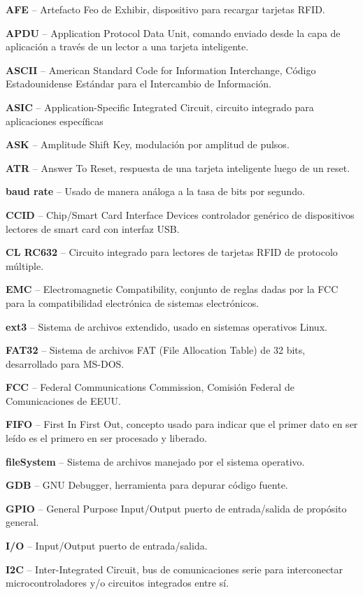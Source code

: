 \begin{glosario}

{\bf{AFE}} – Artefacto Feo de Exhibir, dispositivo para recargar tarjetas RFID.

{\bf{APDU}} – Application Protocol Data Unit, comando enviado desde la capa de aplicación a través de un lector a una tarjeta inteligente.

{\bf{ASCII}} – American Standard Code for Information Interchange, Código Estadounidense Estándar para el Intercambio de Información.

{\bf{ASIC}} – Application-Specific Integrated Circuit, circuito integrado para aplicaciones específicas

{\bf{ASK}} – Amplitude Shift Key, modulación por amplitud de pulsos.

{\bf{ATR}} – Answer To Reset, respuesta de una tarjeta inteligente luego de un reset.

{\bf{baud rate}} – Usado de manera análoga a la tasa de bits por segundo.

{\bf{CCID}} – Chip/Smart Card Interface Devices controlador genérico de dispositivos lectores de smart card con interfaz USB.

{\bf{CL RC632}} – Circuito integrado para lectores de tarjetas RFID de protocolo múltiple.

{\bf{EMC}} – Electromagnetic Compatibility, conjunto de reglas dadas por la FCC para la compatibilidad electrónica de sistemas electrónicos.

{\bf{ext3}} – Sistema de archivos extendido, usado en sistemas operativos Linux.

{\bf{FAT32}} – Sistema de archivos FAT (File Allocation Table) de 32 bits, desarrollado para MS-DOS.

{\bf{FCC}} – Federal Communications Commission, Comisión Federal de Comunicaciones de EEUU.

{\bf{FIFO}}  – First In First Out, concepto usado para indicar que el primer dato en ser leído es el primero en ser procesado y liberado.

{\bf{fileSystem}} – Sistema de archivos manejado por el sistema operativo.

{\bf{GDB}} – GNU Debugger,  herramienta para depurar código fuente.

{\bf{GPIO}} – General Purpose Input/Output  puerto de entrada/salida de propósito general.

{\bf{I/O}} – Input/Output puerto de entrada/salida.

{\bf{I2C}} – Inter-Integrated Circuit, bus de comunicaciones serie para interconectar microcontroladores y/o circuitos integrados entre sí.


\end{glosario}

